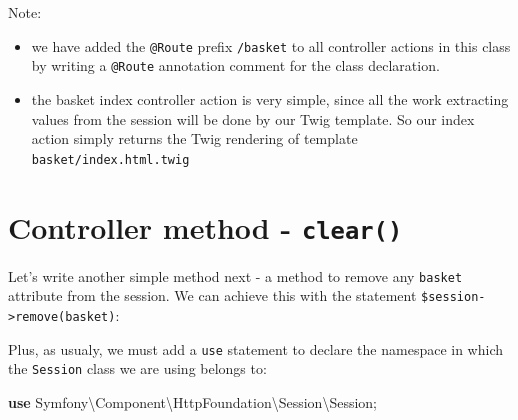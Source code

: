 \documentclass[a4paperpaper,openright]{book}
\newenvironment{Shaded}{}{}
\newcommand{\AnnotationTok}[1]{\textcolor[rgb]{0.38,0.63,0.69}{\textbf{\textit{#1}}}}
\newcommand{\CommentTok}[1]{\textcolor[rgb]{0.38,0.63,0.69}{\textit{#1}}}
\newcommand{\KeywordTok}[1]{\textcolor[rgb]{0.00,0.44,0.13}{\textbf{#1}}}
\newcommand{\NormalTok}[1]{#1}
\newcommand{\OtherTok}[1]{\textcolor[rgb]{0.00,0.44,0.13}{#1}}
\newcommand{\StringTok}[1]{\textcolor[rgb]{0.25,0.44,0.63}{#1}}
\begin{document}
Note:

\begin{itemize}
\item
  we have added the \texttt{@Route} prefix \texttt{/basket} to all
  controller actions in this class by writing a \texttt{@Route}
  annotation comment for the class declaration.
\item
  the basket index controller action is very simple, since all the work
  extracting values from the session will be done by our Twig template.
  So our index action simply returns the Twig rendering of template
  \texttt{basket/index.html.twig}
\end{itemize}

\hypertarget{controller-method---clear}{%
\section{\texorpdfstring{Controller method -
\texttt{clear()}}{Controller method - clear()}}\label{controller-method---clear}}

Let's write another simple method next - a method to remove any
\texttt{basket} attribute from the session. We can achieve this with the
statement
\texttt{\$session-\textgreater{}remove(\textquotesingle{}basket\textquotesingle{})}:

\begin{Shaded}
\end{Shaded}

Plus, as usualy, we must add a \texttt{use} statement to declare the
namespace in which the \texttt{Session} class we are using belongs to:

\begin{Shaded}
\begin{Highlighting}[]
    \KeywordTok{use}\NormalTok{ Symfony\textbackslash{}Component\textbackslash{}HttpFoundation\textbackslash{}Session\textbackslash{}Session}\OtherTok{;}
\end{Highlighting}
\end{Shaded}
\end{document}
